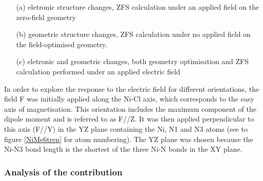 \documentclass[10pt]{report}
\numberwithin{equation}{section}
\begin{document}
\begin{itemize}
    \item[(a)] eletronic structure changes, ZFS calculation under an applied field on the zero-field geometry
    \item[(b)] geometric structure changes, ZFS calculation under no applied field on the field-optimised geometry.
    \item[(c)] eletronic and geometric changes, both geometry optimisation and ZFS calculation performed under an applied electric field
\end{itemize}

In order to explore the response to the electric field for different orientations, the field F was initially applied along the Ni-Cl axis, which corresponds to the easy axis of magnetisation.
This orientation includes the maximum component of the dipole moment and is referred to as F//Z.
It was then applied perpendicular to this axis (F//Y) in the YZ plane containing the Ni, N1 and N3 atoms (see to figure \ref{NiMe6tren} for atom numbering). 
The YZ plane was chosen because the Ni-N3 bond length is the shortest of the three Ni-N bonds in the XY plane.

\subsubsection*{Analysis of the contribution}
\end{document}
